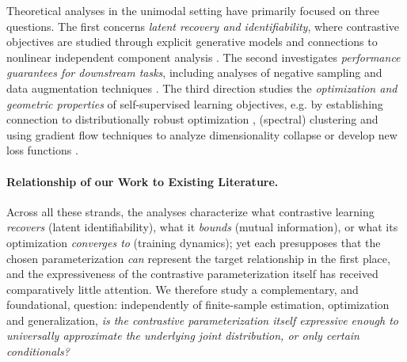 \documentclass{article}
\begin{document}
Theoretical analyses in the unimodal setting have primarily focused on
three questions. The first concerns \emph{latent recovery and
 identifiability}, where contrastive objectives are studied through explicit
generative models and connections to nonlinear independent component
analysis \citep{hyvarinenIndependentComponentAnalysis2004,
 comonHandbookBlindSource2010, hyvarinenNonlinearICAUsing2019a,
 zimmermannContrastiveLearningInverts2021,
 vonkugelgenSelfSupervisedLearningData2021, reizingerCrossEntropyAllYou2024,
 hyvarinenIdentifiabilityLatentvariableStructuralequation2024,
 rusakInfoNCEIdentifyingGap2025}. The second investigates \emph{performance
 guarantees for downstream tasks}, including analyses of negative sampling
\citep{nozawaUnderstandingNegativeSamples2021a,
 awasthiMoreNegativeSamples2022, ashInvestigatingRoleNegatives2022,
 baoSurrogateGapContrastive2022, leiGeneralizationAnalysisContrastive2023,
 zhangAugmentationOverlapTheory2025} and data augmentation techniques
\citep{saunshiTheoreticalAnalysisContrastive2019, leePredictingWhatYou2021,
 wenUnderstandingFeatureLearning2021, wangChaosLadderNew2021,
 toshContrastiveEstimationReveals2021, toshContrastiveLearningMultiview2021,
 huangGeneralizationContrastiveSelfSupervised2022,
 wangRethinkingMinimalSufficient2022,
 wangUnderstandingContrastiveRepresentation2022, jiPowerContrastFeature2023,
 dufumierIntegratingPriorKnowledge2023,
 linStatisticalTheoryContrastive2025a, elstTightPACBayesianRisk2025}.
The third direction studies the \emph{optimization and geometric
 properties} of self-supervised learning objectives, e.g. by establishing
connection to distributionally robust optimization
\citep{wuUnderstandingContrastiveLearning2023}, (spectral) clustering
\citep{haochenProvableGuaranteesSelfSupervised2021,
 tanContrastiveLearningSpectral2023} and using gradient flow techniques to
analyze dimensionality collapse
\citep{jingUnderstandingDimensionalCollapse2021,
 ziyinRotationalSymmetryLoss2022,
 huangTheoreticalAnalysisSelfSupervised2025} or develop new loss functions
\citep{tianUnderstandingDeepContrastive2022a}.

\paragraph{Relationship of our Work to Existing Literature.}
Across all these strands, the analyses characterize what contrastive
learning \emph{recovers} (latent identifiability), what it \emph{bounds}
(mutual information), or what its optimization \emph{converges to}
(training dynamics); yet each presupposes that the chosen parameterization
\emph{can} represent the target relationship in the first place, and the
expressiveness of the contrastive parameterization itself has received
comparatively little attention. We therefore study a complementary, and
foundational, question: independently of finite-sample estimation,
optimization and generalization, \emph{is the contrastive parameterization
 itself expressive enough to universally approximate the underlying joint
 distribution, or only certain conditionals?}
\end{document}
